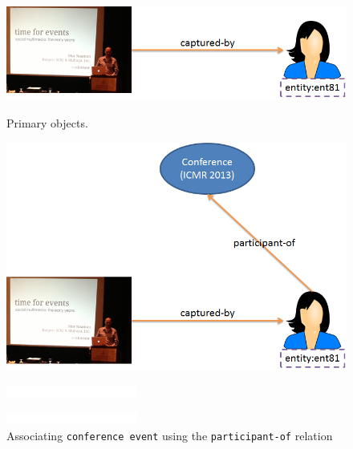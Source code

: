 \begin{figure}[t]
\begin{minipage}[b]{0.48\linewidth}
\centering
\includegraphics[width=\textwidth]{media/chapter2/naaman-1.png}
\caption{Primary objects.}
\label{fig:naaman-example-1}
\end{minipage}
\hspace{0.5cm}
\begin{minipage}[b]{0.45\linewidth}
\centering
\includegraphics[width=\textwidth]{media/chapter2/naaman-2.png}
\caption{Associating \texttt{conference event} using the \texttt{participant-of} relation}
\label{fig:naaman-example-2}
\end{minipage}
\begin{minipage}[b]{0.48\linewidth}
\centering
\includegraphics[width=\textwidth]{media/chapter2/white.png}
\label{fig:naaman-example-x}
\end{minipage}
\hspace{0.5cm}
\begin{minipage}[b]{0.45\linewidth}
\centering
\includegraphics[width=\textwidth]{media/chapter2/white.png}

\end{minipage}
\end{figure}
